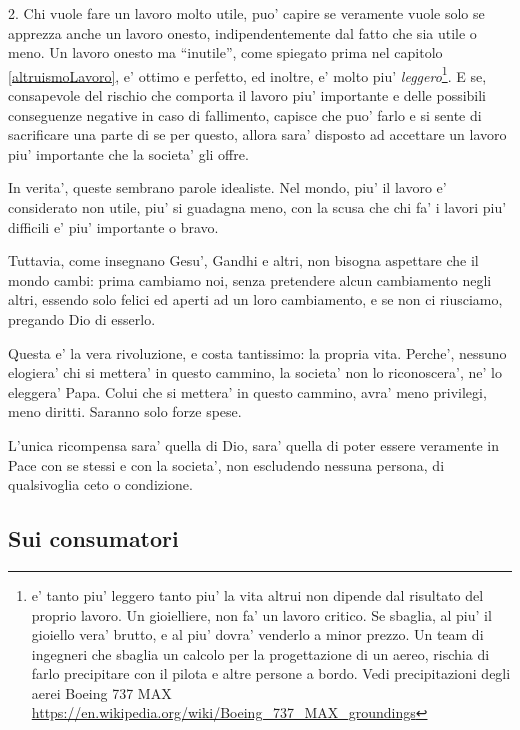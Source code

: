 2. Chi vuole fare un lavoro molto utile, puo' capire se veramente vuole solo se apprezza anche un lavoro onesto, indipendentemente dal fatto che sia utile o meno. Un lavoro onesto ma ``inutile'', come spiegato prima nel capitolo \ref{altruismoLavoro}, e' ottimo e perfetto, ed inoltre, e' molto piu' \emph{leggero}\footnote{e' tanto piu' leggero tanto piu' la vita altrui non dipende dal risultato del proprio lavoro. Un gioielliere, non fa' un lavoro critico. Se sbaglia, al piu' il gioiello vera' brutto, e al piu' dovra' venderlo a minor prezzo. Un team di ingegneri che sbaglia un calcolo per la progettazione di un aereo, rischia di farlo precipitare con il pilota e altre persone a bordo. Vedi precipitazioni degli aerei Boeing 737 MAX \url{https://en.wikipedia.org/wiki/Boeing\_737\_MAX\_groundings}}. 
E se, consapevole del rischio che comporta il lavoro piu' importante e delle possibili conseguenze negative in caso di fallimento, capisce che puo' farlo e si sente di sacrificare una parte di se per questo, allora sara' disposto ad accettare un lavoro piu' importante che la societa' gli offre.

In verita', queste sembrano parole idealiste. Nel mondo, piu' il lavoro e' considerato non utile, piu' si guadagna meno, con la scusa che chi fa' i lavori piu' difficili e' piu' importante o bravo.

Tuttavia, come insegnano Gesu', Gandhi e altri, non bisogna aspettare che il mondo cambi: prima cambiamo noi, senza pretendere alcun cambiamento negli altri, essendo solo felici ed aperti ad un loro cambiamento, e se non ci riusciamo, pregando Dio di esserlo.

Questa e' la vera rivoluzione, e costa tantissimo: la propria vita. Perche', nessuno elogiera' chi si mettera' in questo cammino, la societa' non lo riconoscera', ne' lo eleggera' Papa. Colui che si mettera' in questo cammino, avra' meno privilegi, meno diritti. Saranno solo forze spese. 

L'unica ricompensa sara' quella di Dio, sara' quella di poter essere veramente in Pace con se stessi e con la societa', non escludendo nessuna persona, di qualsivoglia ceto o condizione.

\subsection{Sui consumatori}

